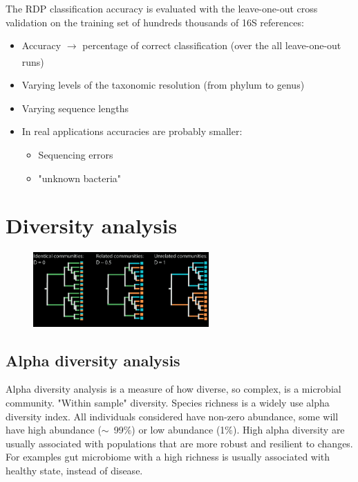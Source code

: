The RDP classification accuracy is evaluated with the leave-one-out cross validation on the training set of hundreds thousands of 16S references: 

\begin{itemize}
    \item Accuracy $\xrightarrow[]{}$ percentage of correct classification (over the all leave-one-out runs)
    \item Varying levels of the taxonomic resolution (from phylum to genus)
    \item Varying sequence lengths
    \item In real applications accuracies are probably smaller:
    \begin{itemize}
        \item Sequencing errors
        \item "unknown bacteria"
    \end{itemize}

\end{itemize}

\section{Diversity analysis}

\begin{figure}[h]
\centering
\includegraphics[width=0.6\textwidth]{UniFrac.png}
\caption{}
\end{figure}

\subsection{Alpha diversity analysis}

Alpha diversity analysis is a measure of how diverse, so complex, is a microbial community. "Within sample" diversity. Species richness is a widely use alpha diversity index. 
All individuals considered have non-zero abundance, some will have high abundance ($\sim$~99$\%$) or low abundance (1$\%$). High alpha diversity are usually associated with populations that are more robust and resilient to changes.
For examples gut microbiome with a high richness is usually associated with healthy state, instead of disease. 

